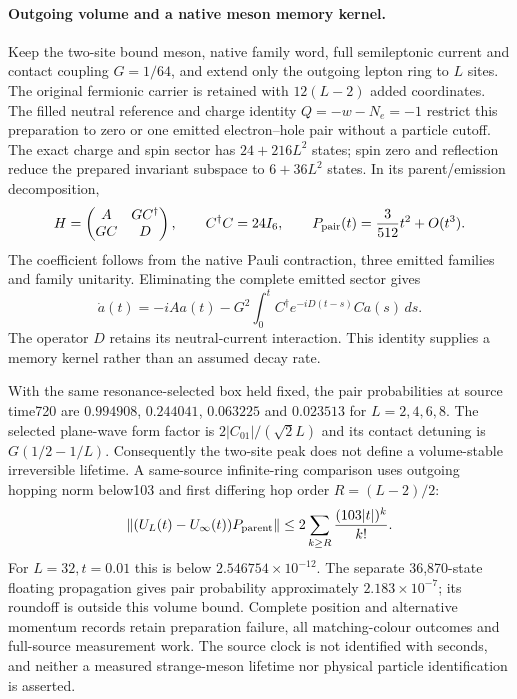 \paragraph{Outgoing volume and a native meson memory kernel.}
Keep the two-site bound meson, native family word, full semileptonic current
and contact coupling $G=1/64$, and extend only the outgoing lepton ring to
$L$ sites. The original fermionic carrier is retained with $12(L-2)$ added
coordinates. The filled neutral reference and charge identity
$Q=-w-N_e=-1$ restrict this preparation to zero or one emitted electron--hole
pair without a particle cutoff. The exact charge and spin sector has
$24+216L^2$ states; spin zero and reflection reduce the prepared invariant
subspace to $6+36L^2$ states. In its parent/emission decomposition,
\[
 H=\begin{pmatrix}A&GC^\dagger\\GC&D\end{pmatrix},\qquad
 C^\dagger C=24I_6,\qquad
 P_{\rm pair}(t)=\frac{3}{512}t^2+O(t^3).
\]
The coefficient follows from the native Pauli contraction, three emitted
families and family unitarity. Eliminating the complete emitted sector gives
\[
 \dot a(t)=-iAa(t)-G^2\int_0^t C^\dagger e^{-iD(t-s)}C a(s)\,ds .
\]
The operator $D$ retains its neutral-current interaction. This identity
supplies a memory kernel rather than an assumed decay rate.

With the same resonance-selected box held fixed, the pair probabilities at
source time720 are $0.994908$, $0.244041$, $0.063225$ and $0.023513$ for
$L=2,4,6,8$. The selected plane-wave form factor is
$2|C_{01}|/(\sqrt2L)$ and its contact detuning is $G(1/2-1/L)$.
Consequently the two-site peak does not define a volume-stable irreversible
lifetime. A same-source infinite-ring comparison uses outgoing hopping norm
below103 and first differing hop order $R=(L-2)/2$:
\[
 \|(U_L(t)-U_\infty(t))P_{\rm parent}\|
 \leq 2\sum_{k\geq R}\frac{(103|t|)^k}{k!}.
\]
For $L=32,t=0.01$ this is below $2.546754\times10^{-12}$. The separate
36,870-state floating propagation gives pair probability approximately
$2.183\times10^{-7}$; its roundoff is outside this volume bound. Complete
position and alternative momentum records retain preparation failure,
all matching-colour outcomes and full-source measurement work. The source
clock is not identified with seconds, and neither a measured strange-meson
lifetime nor physical particle identification is asserted.
